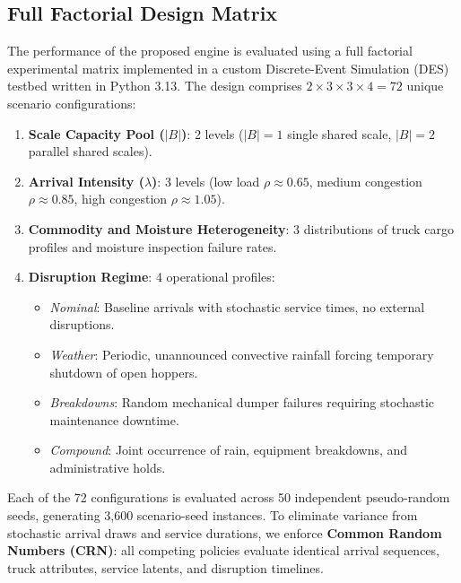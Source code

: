 \documentclass[12pt,a4paper]{article}
\begin{document}
\subsection{Full Factorial Design Matrix}
The performance of the proposed engine is evaluated using a full factorial experimental matrix implemented in a custom Discrete-Event Simulation (DES) testbed written in Python 3.13. The design comprises $2 \times 3 \times 3 \times 4 = 72$ unique scenario configurations:
\begin{enumerate}[leftmargin=1.2cm,itemsep=0pt,topsep=2pt]
  \item \textbf{Scale Capacity Pool ($|B|$)}: 2 levels ($|B|=1$ single shared scale, $|B|=2$ parallel shared scales).
  \item \textbf{Arrival Intensity ($\lambda$)}: 3 levels (low load $\rho \approx 0.65$, medium congestion $\rho \approx 0.85$, high congestion $\rho \approx 1.05$).
  \item \textbf{Commodity and Moisture Heterogeneity}: 3 distributions of truck cargo profiles and moisture inspection failure rates.
  \item \textbf{Disruption Regime}: 4 operational profiles:
    \begin{itemize}[leftmargin=0.8cm,itemsep=0pt]
      \item \emph{Nominal}: Baseline arrivals with stochastic service times, no external disruptions.
      \item \emph{Weather}: Periodic, unannounced convective rainfall forcing temporary shutdown of open hoppers.
      \item \emph{Breakdowns}: Random mechanical dumper failures requiring stochastic maintenance downtime.
      \item \emph{Compound}: Joint occurrence of rain, equipment breakdowns, and administrative holds.
    \end{itemize}
\end{enumerate}

Each of the 72 configurations is evaluated across 50 independent pseudo-random seeds, generating 3,600 scenario-seed instances. To eliminate variance from stochastic arrival draws and service durations, we enforce \textbf{Common Random Numbers (CRN)}: all competing policies evaluate identical arrival sequences, truck attributes, service latents, and disruption timelines.
\end{document}
